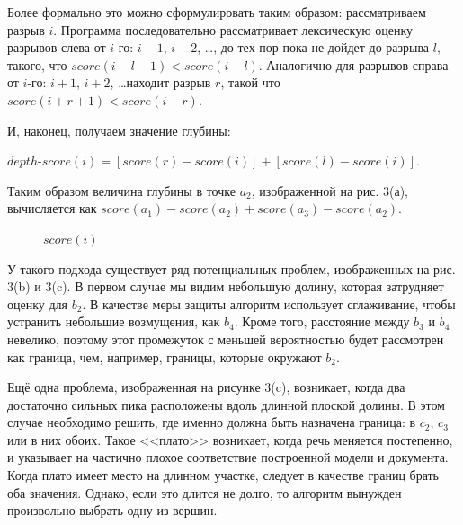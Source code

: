 \documentclass[12pt]{article}
\newcounter{c_tab}
\begin{document}
\begin{enumerate}
{		Более формально это можно сформулировать таким образом: рассматриваем разрыв $i$. Программа последовательно рассматривает лексическую оценку разрывов слева от $i$-го: $i-1$, $i-2$, \ldots, до тех пор пока не дойдет до разрыва $l$, такого, что $score(i-l-1) < score(i-l)$. Аналогично для разрывов справа от $i$-го: $i+1$, $i+2$, \ldots находит разрыв $r$, такой что $score(i+r+1) < score(i+r)$. 
		
		И, наконец, получаем значение глубины: 
		\begin{center}
			$depth$-$score(i) = [score(r) - score(i)] + [score(l) - score(i)].$ 
		\end{center}
		
		Таким образом величина глубины в точке $a_2$, изображенной на рис. 3(а), вычисляется как $score(a_1) - score(a_2) + score(a_3) - score(a_2)$.
		
		\vspace{5pt}
		\begin{figure}[h!]
			\caption{$score(i)$}
			\label{im3}
		\end{figure}
		\vspace{5pt}
		
		У такого подхода существует ряд потенциальных проблем, изображенных на рис. 3(b) и 3(c). В первом случае мы видим небольшую долину, которая затрудняет оценку для $b_2$. В качестве меры защиты алгоритм использует сглаживание, чтобы устранить небольшие возмущения, как $b_4$. Кроме того, расстояние между $b_3$ и $b_4$ невелико, поэтому этот промежуток с меньшей вероятностью будет рассмотрен как граница, чем, например, границы, которые окружают $b_2$. 
		
		Ещё одна проблема, изображенная на рисунке 3(c), возникает, когда два достаточно сильных пика расположены вдоль длинной плоской долины. В этом случае необходимо решить, где именно должна быть назначена граница: в $c_2$, $c_3$ или в них обоих. Такое <<плато>> возникает, когда речь меняется постепенно, и указывает на частично плохое соответствие построенной модели и документа. Когда плато имеет место на длинном участке, следует в качестве границ брать оба значения. Однако, если это длится не долго, то алгоритм вынужден произвольно выбрать одну из вершин. 
		
}
\end{enumerate}
\end{document}
